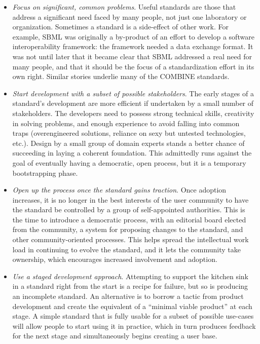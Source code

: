 \vspace*{-1em}
\begin{itemize}

\item \emph{Focus on significant, common problems}.  Useful standards are those that address a significant need faced by many people, not just one laboratory or organization.  Sometimes a standard is a side-effect of other work.  For example, SBML was originally a by-product of an effort to develop a software interoperability framework: the framework needed a data exchange format.  It was not until later that it became clear that SBML addressed a real need for many people, and that it should be the focus of a standardization effort in its own right.  Similar stories underlie many of the COMBINE standards.

\item \emph{Start development with a subset of possible stakeholders}.  The early stages of a standard's development are more efficient if undertaken by a small number of stakeholders.  The developers need to possess strong technical skills, creativity in solving problems, and enough experience to avoid falling into common traps (\eg overengineered solutions, reliance on sexy but untested technologies, etc.).  Design by a small group of domain experts stands a better chance of succeeding in laying a coherent foundation.  This admittedly runs against the goal of eventually having a democratic, open process, but it is a temporary bootstrapping phase.

\item \emph{Open up the process once the standard gains traction}.  Once adoption increases, it is no longer in the best interests of the user community to have the standard be controlled by a group of self-appointed authorities.  This is the time to introduce a democratic process, with an editorial board elected from the community, a system for proposing changes to the standard, and other community-oriented processes.  This helps spread the intellectual work load in continuing to evolve the standard, and it lets the community take ownership, which encourages increased involvement and adoption.

\item \emph{Use a staged development approach}.  Attempting to support the kitchen sink in a standard right from the start is a recipe for failure, but so is producing an incomplete standard.  An alternative is to borrow a tactic from product development and create the equivalent of a ``minimal viable product'' at each stage.  A simple standard that is fully usable for a subset of possible use-cases will allow people to start using it in practice, which in turn produces feedback for the next stage and simultaneously begins creating a user base.


\end{itemize}

